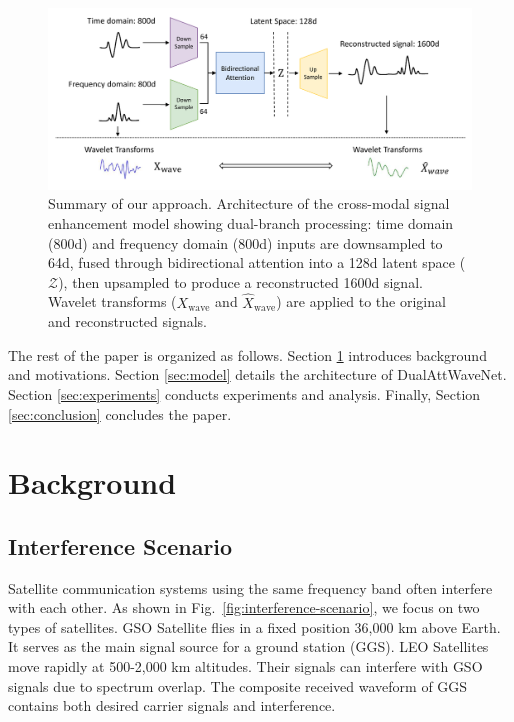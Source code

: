 \documentclass[conference]{IEEEtran}
\begin{document}
\begin{figure}[tb]
    \centering
    \includegraphics[width=0.76\linewidth]{overview.pdf}
    \caption{Summary of our approach. Architecture of the cross-modal signal enhancement model showing dual-branch processing: time domain (800d) and frequency domain (800d) inputs are downsampled to 64d, fused through bidirectional attention into a 128d latent space ($\mathcal{Z}$), then upsampled to produce a reconstructed 1600d signal. Wavelet transforms ($X_\text{wave}$ and $\hat{X}_{\text{wave}}$) are applied to the original and reconstructed signals.}

    \label{fig:overview}
\end{figure}

The rest of the paper is organized as follows. Section \ref{sec:background} introduces background and motivations. Section \ref{sec:model} details the architecture of DualAttWaveNet. Section \ref{sec:experiments} conducts experiments and analysis. Finally, Section \ref{sec:conclusion} concludes the paper.

\section{Background}
\label{sec:background}

\subsection{Interference Scenario}



Satellite communication systems using the same frequency band often interfere with each other. As shown in Fig.~\ref{fig:interference-scenario}, we focus on two types of satellites. GSO Satellite flies in a fixed position 36,000 km above Earth. It serves as the main signal source for a ground station (GGS). LEO Satellites move rapidly at 500-2,000 km altitudes. Their signals can interfere with GSO signals due to spectrum overlap. The composite received waveform of GGS contains both desired carrier signals and interference.
\end{document}

